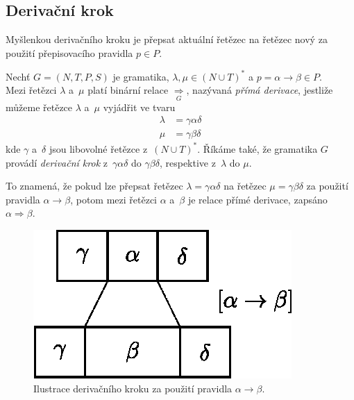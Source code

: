 \subsection*{Derivační krok}\label{kap_der_krok}
Myšlenkou derivačního kroku je přepsat aktuální řetězec na řetězec nový za použití přepisovacího pravidla $p \in P$.
\begin{definition}\label{def_derivacni_krok}
    Nechť $G = (N, T, P, S)$ je gramatika, $\lambda, \mu  \in (N \cup T)^*$ a $p = \alpha \rightarrow \beta \in P$. \\
    Mezi řetězci $\lambda$ a~$\mu$ platí binární relace $\underset{\scriptscriptstyle G}{\Rightarrow}$, nazývaná \emph{přímá derivace}, jestliže můžeme řetězce $\lambda$ a~$\mu$ vyjádřit ve tvaru
    \begin{align*}
        \lambda &= \gamma \alpha \delta \\
        \mu &= \gamma \beta \delta 
    \end{align*}
    kde $\gamma$ a~$\delta$ jsou libovolné řetězce z~$(N \cup T)^*$. 
    Říkáme také, že gramatika $G$ provádí \emph{derivační krok} z~$\gamma \alpha \delta$ do $\gamma \beta \delta$, respektive z~$\lambda$ do $\mu$.
\end{definition}
To znamená, že pokud lze přepsat řetězec $\lambda = \gamma \alpha \delta$ na řetězec $\mu = \gamma \beta \delta$ za použití pravidla $\alpha \rightarrow \beta$, potom mezi řetězci $\alpha$ a~$\beta$ je relace přímé derivace, zapsáno $\alpha \Rightarrow \beta$.

\begin{figure}[ht]\label{fig_der_krok}
    \centering
    \vspace*{0.5em}
    \includegraphics{obrazky-figures/derivacni_krok_bkg.eps}
    \caption{Ilustrace derivačního kroku za použití pravidla $\alpha \rightarrow \beta$.}
\end{figure}

